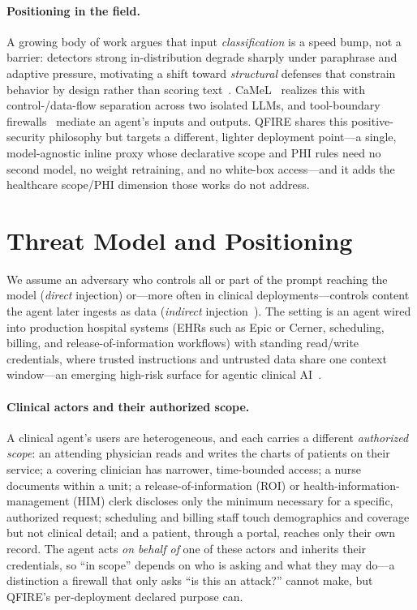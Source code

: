 \documentclass[11pt]{article}
\begin{document}
\paragraph{Positioning in the field.} A growing body of work argues that input
\emph{classification} is a speed bump, not a barrier: detectors strong
in-distribution degrade sharply under paraphrase and adaptive pressure, motivating a
shift toward \emph{structural} defenses that constrain behavior by design rather than
scoring text~\cite{camel2025,firewallsbench2026}. CaMeL~\cite{camel2025} realizes this
with control-/data-flow separation across two isolated LLMs, and tool-boundary
firewalls~\cite{firewallsbench2026} mediate an agent's inputs and outputs. QFIRE shares
this positive-security philosophy but targets a different, lighter deployment point---a
single, model-agnostic inline proxy whose declarative scope and PHI rules need no second
model, no weight retraining, and no white-box access---and it adds the healthcare
scope/PHI dimension those works do not address.

\section{Threat Model and Positioning}
We assume an adversary who controls all or part of the prompt reaching the model
(\emph{direct} injection) or---more often in clinical deployments---controls content
the agent later ingests as data (\emph{indirect} injection~\cite{greshake2023}). The
setting is an agent wired into production hospital systems (EHRs such as Epic or
Cerner, scheduling, billing, and release-of-information workflows) with standing
read/write credentials, where trusted instructions and untrusted data share one
context window---an emerging high-risk surface for agentic clinical
AI~\cite{caging_agents2026,jamapromptinj2025}.

\paragraph{Clinical actors and their authorized scope.}
A clinical agent's users are heterogeneous, and each carries a different
\emph{authorized scope}: an attending physician reads and writes the charts of patients
on their service; a covering clinician has narrower, time-bounded access; a nurse
documents within a unit; a release-of-information (ROI) or health-information-management
(HIM) clerk discloses only the minimum necessary for a specific, authorized request;
scheduling and billing staff touch demographics and coverage but not clinical detail;
and a patient, through a portal, reaches only their own record. The agent acts
\emph{on behalf of} one of these actors and inherits their credentials, so ``in scope''
depends on who is asking and what they may do---a distinction a firewall that only asks
``is this an attack?'' cannot make, but QFIRE's per-deployment declared purpose can.
\end{document}
